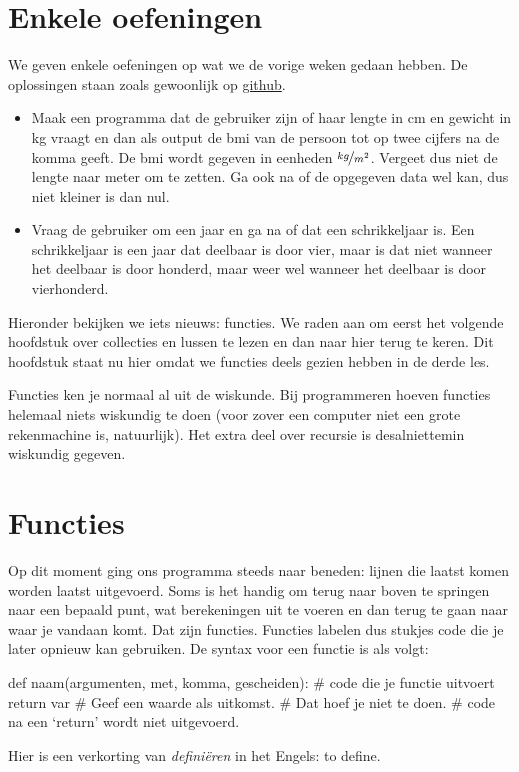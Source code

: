 \section*{Enkele oefeningen}
  We geven enkele oefeningen op wat we de vorige weken gedaan hebben. De
  oplossingen staan zoals gewoonlijk op
  \href{https://github.com/TGThorax/python-ka2ring/tree/master/src}{github}.
  \begin{itemize}
  \item Maak een programma dat de gebruiker zijn of haar lengte in cm en gewicht
    in kg vraagt en dan als output de bmi van de persoon tot op twee cijfers na
    de komma geeft. De bmi wordt gegeven in eenheden $\nicefrac{kg}{m^2}$.
    Vergeet dus niet de lengte naar meter om te zetten. Ga ook na of de
    opgegeven data wel kan, dus niet kleiner is dan nul.
  \item Vraag de gebruiker om een jaar en ga na of dat een schrikkeljaar is.
    Een schrikkeljaar is een jaar dat deelbaar is door vier, maar is dat
    niet wanneer het deelbaar is door honderd, maar weer wel wanneer het
    deelbaar is door vierhonderd.
  \end{itemize}
  Hieronder bekijken we iets nieuws: functies. We raden aan om eerst het
  volgende hoofdstuk over collecties en lussen te lezen en dan naar hier
  terug te keren. Dit hoofdstuk staat nu hier omdat we functies deels gezien
  hebben in de derde les.

  Functies ken je normaal al uit de
  wiskunde. Bij programmeren hoeven functies helemaal niets wiskundig te
  doen (voor zover een computer niet een grote rekenmachine is, natuurlijk). Het
  extra deel over recursie is desalniettemin wiskundig gegeven.
\section{Functies}
  Op dit moment ging ons programma steeds naar beneden: lijnen die laatst
  komen worden laatst uitgevoerd. Soms is het handig om terug naar boven te
  springen naar een bepaald punt, wat berekeningen uit te voeren en dan terug
  te gaan naar waar je vandaan komt. Dat zijn functies. Functies labelen dus
  stukjes code die je later opnieuw kan gebruiken. De syntax voor een functie
  is als volgt:
  \begin{python}
    def naam(argumenten, met, komma, gescheiden):
      # code die je functie uitvoert
      return var # Geef een waarde als uitkomst.
                 # Dat hoef je niet te doen.
      # code na een `return' wordt niet uitgevoerd.
  \end{python}
  Hier is  een verkorting van \emph{defini\"eren} in het Engels: to
  define.

